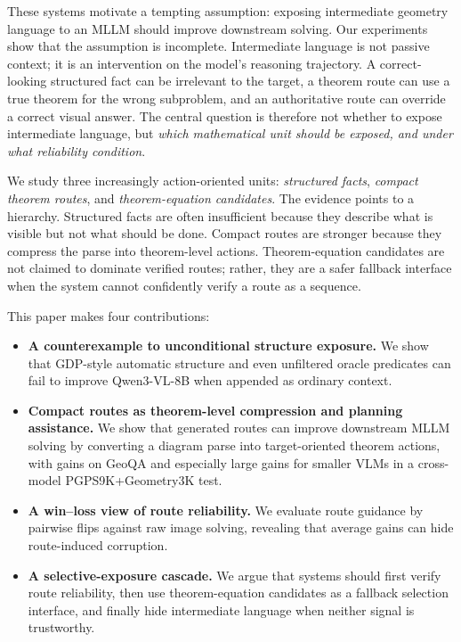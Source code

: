 \documentclass[11pt]{article}
\begin{document}
These systems motivate a tempting assumption: exposing intermediate geometry language to an MLLM should improve downstream solving. Our experiments show that the assumption is incomplete. Intermediate language is not passive context; it is an intervention on the model's reasoning trajectory. A correct-looking structured fact can be irrelevant to the target, a theorem route can use a true theorem for the wrong subproblem, and an authoritative route can override a correct visual answer. The central question is therefore not whether to expose intermediate language, but \emph{which mathematical unit should be exposed, and under what reliability condition}.

We study three increasingly action-oriented units: \emph{structured facts}, \emph{compact theorem routes}, and \emph{theorem-equation candidates}. The evidence points to a hierarchy. Structured facts are often insufficient because they describe what is visible but not what should be done. Compact routes are stronger because they compress the parse into theorem-level actions. Theorem-equation candidates are not claimed to dominate verified routes; rather, they are a safer fallback interface when the system cannot confidently verify a route as a sequence.

This paper makes four contributions:
\begin{itemize}[leftmargin=*]
\item \textbf{A counterexample to unconditional structure exposure.} We show that GDP-style automatic structure and even unfiltered oracle predicates can fail to improve Qwen3-VL-8B when appended as ordinary context.
\item \textbf{Compact routes as theorem-level compression and planning assistance.} We show that generated routes can improve downstream MLLM solving by converting a diagram parse into target-oriented theorem actions, with gains on GeoQA and especially large gains for smaller VLMs in a cross-model PGPS9K+Geometry3K test.
\item \textbf{A win--loss view of route reliability.} We evaluate route guidance by pairwise flips against raw image solving, revealing that average gains can hide route-induced corruption.
\item \textbf{A selective-exposure cascade.} We argue that systems should first verify route reliability, then use theorem-equation candidates as a fallback selection interface, and finally hide intermediate language when neither signal is trustworthy.
\end{itemize}
\end{document}
